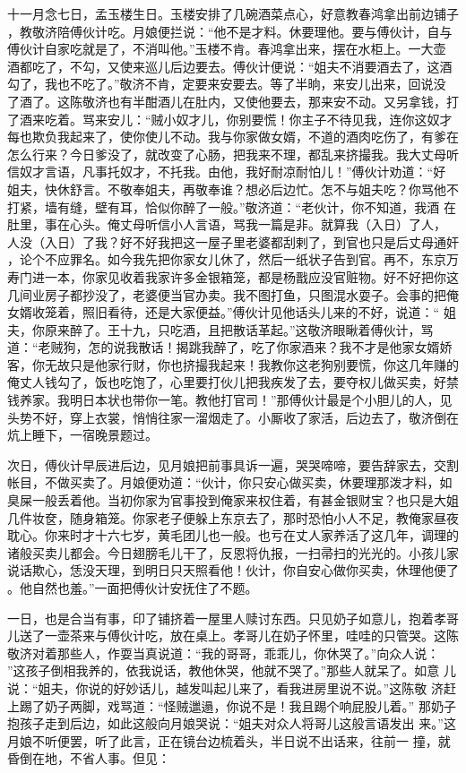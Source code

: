 十一月念七日，孟玉楼生日。玉楼安排了几碗酒菜点心，好意教春鸿拿出前边铺子
，教敬济陪傅伙计吃。月娘便拦说：“他不是才料。休要理他。要与傅伙计，自与
傅伙计自家吃就是了，不消叫他。”玉楼不肯。春鸿拿出来，摆在水柜上。一大壶
酒都吃了，不勾，又使来巡儿后边要去。傅伙计便说：“姐夫不消要酒去了，这酒
勾了，我也不吃了。”敬济不肯，定要来安要去。等了半晌，来安儿出来，回说没
了酒了。这陈敬济也有半酣酒儿在肚内，又使他要去，那来安不动。又另拿钱，打
了酒来吃着。骂来安儿：“贼小奴才儿，你别要慌！你主子不待见我，连你这奴才
每也欺负我起来了，使你使儿不动。我与你家做女婿，不道的酒肉吃伤了，有爹在
怎么行来？今日爹没了，就改变了心肠，把我来不理，都乱来挤撮我。我大丈母听
信奴才言语，凡事托奴才，不托我。由他，我好耐凉耐怕儿！”傅伙计劝道：“好
姐夫，快休舒言。不敬奉姐夫，再敬奉谁？想必后边忙。怎不与姐夫吃？你骂他不
打紧，墙有缝，壁有耳，恰似你醉了一般。”敬济道：“老伙计，你不知道，我酒
在肚里，事在心头。俺丈母听信小人言语，骂我一篇是非。就算我（入日）了人，
人没（入日）了我？好不好我把这一屋子里老婆都刮剌了，到官也只是后丈母通奸
，论个不应罪名。如今我先把你家女儿休了，然后一纸状子告到官。再不，东京万
寿门进一本，你家见收着我家许多金银箱笼，都是杨戬应没官赃物。好不好把你这
几间业房子都抄没了，老婆便当官办卖。我不图打鱼，只图混水耍子。会事的把俺
女婿收笼着，照旧看待，还是大家便益。”傅伙计见他话头儿来的不好，说道：“
姐夫，你原来醉了。王十九，只吃酒，且把散话革起。”这敬济眼瞅着傅伙计，骂
道：“老贼狗，怎的说我散话！揭跳我醉了，吃了你家酒来？我不才是他家女婿娇
客，你无故只是他家行财，你也挤撮我起来！我教你这老狗别要慌，你这几年赚的
俺丈人钱勾了，饭也吃饱了，心里要打伙儿把我疾发了去，要夺权儿做买卖，好禁
钱养家。我明日本状也带你一笔。教他打官司！”那傅伙计最是个小胆儿的人，见
头势不好，穿上衣裳，悄悄往家一溜烟走了。小厮收了家活，后边去了，敬济倒在
炕上睡下，一宿晚景题过。

次日，傅伙计早辰进后边，见月娘把前事具诉一遍，哭哭啼啼，要告辞家去，交割
帐目，不做买卖了。月娘便劝道：“伙计，你只安心做买卖，休要理那泼才料，如
臭屎一般丢着他。当初你家为官事投到俺家来权住着，有甚金银财宝？也只是大姐
几件妆奁，随身箱笼。你家老子便躲上东京去了，那时恐怕小人不足，教俺家昼夜
耽心。你来时才十六七岁，黄毛团儿也一般。也亏在丈人家养活了这几年，调理的
诸般买卖儿都会。今日翅膀毛儿干了，反恩将仇报，一扫帚扫的光光的。小孩儿家
说话欺心，恁没天理，到明日只天照看他！伙计，你自安心做你买卖，休理他便了
。他自然也羞。”一面把傅伙计安抚住了不题。

一日，也是合当有事，印了铺挤着一屋里人赎讨东西。只见奶子如意儿，抱着孝哥
儿送了一壶茶来与傅伙计吃，放在桌上。孝哥儿在奶子怀里，哇哇的只管哭。这陈
敬济对着那些人，作耍当真说道：“我的哥哥，乖乖儿，你休哭了。”向众人说：
”这孩子倒相我养的，依我说话，教他休哭，他就不哭了。”那些人就呆了。如意
儿说：“姐夫，你说的好妙话儿，越发叫起儿来了，看我进房里说不说。”这陈敬
济赶上踢了奶子两脚，戏骂道：“怪贼邋遢，你说不是！我且踢个响屁股儿着。”
那奶子抱孩子走到后边，如此这般向月娘哭说：“姐夫对众人将哥儿这般言语发出
来。”这月娘不听便罢，听了此言，正在镜台边梳着头，半日说不出话来，往前一
撞，就昏倒在地，不省人事。但见：

